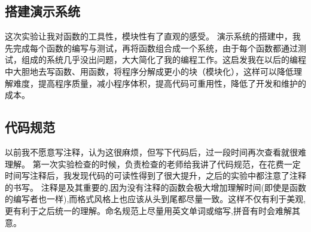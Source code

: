 \documentclass[supercite]{Experimental_Report}
\theoremstyle{definition}
\begin{document}
\subsection{搭建演示系统}
这次实验让我对函数的工具性，模块性有了直观的感受。
演示系统的搭建中，我先完成每个函数的编写与测试，再将函数组合成一个系统，由于每个函数都通过测试，组成的系统几乎没出问题，大大简化了我的编程工作。这启发我在以后的编程中大胆地去写函数、用函数，将程序分解成更小的块（模块化），这样可以降低理解难度，提高程序质量，减小程序体积，提高代码可重用性，降低了开发和维护的成本。\par
\subsection{代码规范}
以前我不愿意写注释，认为这很麻烦，但写下代码后，过一段时间再次查看就很难理解。
第一次实验检查的时候，负责检查的老师给我讲了代码规范，在花费一定时间写注释后，我发现代码的可读性得到了很大提升，之后的实验中都注意了注释的书写。
注释是及其重要的,因为没有注释的函数会极大增加理解时间(即使是函数的编写者也一样),而格式风格上也应该从头到尾都尽量一致。这样不仅有利于美观,更有利于之后统一的理解。命名规范上尽量用英文单词或缩写,拼音有时会难解其意。
\nocite{*} %



\setcounter{secnumdepth}{0}
\appendix
\end{document}
